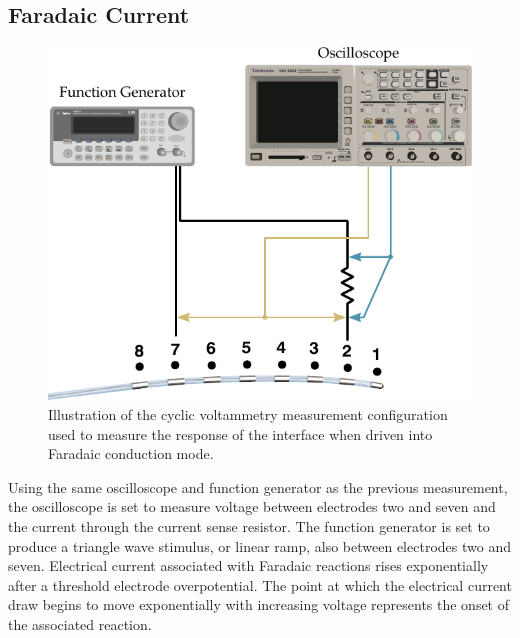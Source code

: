     \subsection{Faradaic Current}
      \begin{figure}
        \centering
        \includegraphics{content/pt2/08-InterfaceParameters/graphics/measurement_Faradaic_setup_initial}
        \caption{\label{fig:pt2-measurement_Faradaic_setup_initial}Illustration of the cyclic voltammetry measurement configuration used to measure the response of the interface when driven into Faradaic conduction mode.}
      \end{figure}
      Using the same oscilloscope and function generator as the previous measurement, the oscilloscope is set to measure voltage between electrodes two and seven and the current through the current sense resistor.
      The function generator is set to produce a triangle wave stimulus, or linear ramp, also between electrodes two and seven.
      Electrical current associated with Faradaic reactions rises exponentially after a threshold electrode overpotential.
      The point at which the electrical current draw begins to move exponentially with increasing voltage represents the onset of the associated reaction.
